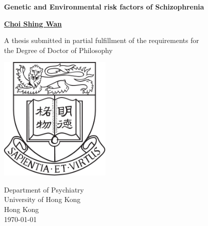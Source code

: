\documentclass[12pt]{book}
\begin{document}
\thispagestyle{empty}
\pagestyle{empty}

\begin{singlespace}
	\begin{titlepage}
		\begin{center}
			\vspace*{1cm}
			
			\Huge
			\textbf{Genetic and Environmental risk factors of Schizophrenia}
			
			\vspace{0.5cm}
			\LARGE
			
			\vspace{1.5cm}
			
			\textbf{\href{mailto:choishingwan@gmail.com}{Choi Shing Wan}}
			
			\vfill
			
			A thesis submitted in partial fulfillment of the requirements for \\
			the Degree of Doctor of Philosophy
			
			\vspace{0.8cm}
			
			\includegraphics[width=0.4\textwidth]{figure/hkuLogo.jpg}
			
			\Large
			Department of Psychiatry\\
			University of Hong Kong\\
			Hong Kong\\
			\today
			
		\end{center}
	\end{titlepage}
\end{singlespace}


\frontmatter 

	\cleardoublepage
\end{document}
